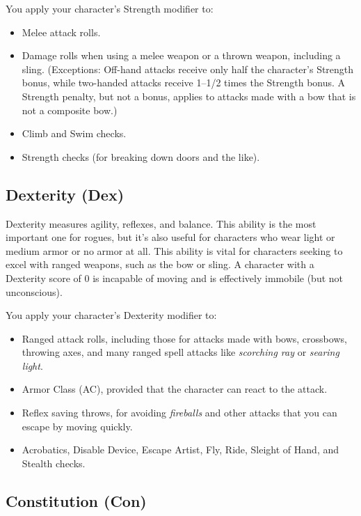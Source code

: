 You apply your character's Strength modifier to:
				\begin{itemize}\item  Melee attack rolls.
				\item  Damage rolls when using a melee weapon or a thrown weapon, including a sling. (Exceptions: Off-hand attacks receive only half the character's Strength bonus, while two-handed attacks receive 1--1/2 times the Strength bonus. A Strength penalty, but not a bonus, applies to attacks made with a bow that is not a composite bow.)
				\item  Climb and Swim checks.
				\item  Strength checks (for breaking down doors and the like).
\end{itemize}
				
\subsection{Dexterity (Dex)}

				
Dexterity measures agility, reflexes, and balance. This ability is the most important one for rogues, but it's also useful for characters who wear light or medium armor or no armor at all. This ability is vital for characters seeking to excel with ranged weapons, such as the bow or sling. A character with a Dexterity score of 0 is incapable of moving and is effectively immobile (but not unconscious).
				
You apply your character's Dexterity modifier to:
				\begin{itemize}\item  Ranged attack rolls, including those for attacks made with bows, crossbows, throwing axes, and many ranged spell attacks like \textit{scorching ray} or \textit{searing light}.
				\item  Armor Class (AC), provided that the character can react to the attack.
				\item  Reflex saving throws, for avoiding \textit{fireballs} and other attacks that you can escape by moving quickly.
				\item  Acrobatics, Disable Device, Escape Artist, Fly, Ride, Sleight of Hand, and Stealth checks.
\end{itemize}
				
\subsection{Constitution (Con)}

